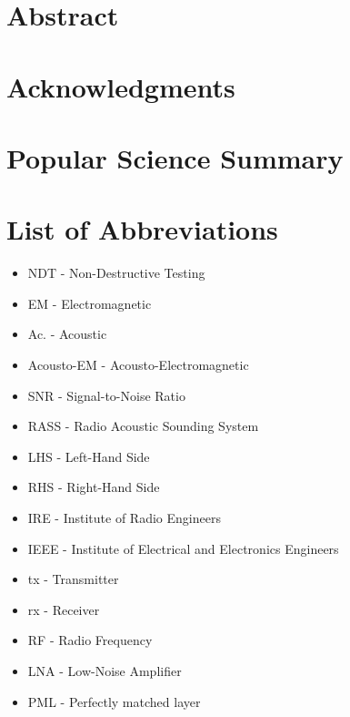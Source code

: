 \documentclass[10pt,a4paper]{eitExjobb}
\begin{document}
	
	
	\MakeTitlePage  %
	
	\frontmatter    %
	
	\chapter*{Abstract}
	
	\chapter*{Acknowledgments}
	
	\chapter*{Popular Science Summary}
	\tableofcontents
	\listoffigures
	\listoftables
	\chapter*{List of Abbreviations}
	\begin{itemize}
		\item NDT - Non-Destructive Testing
		\item EM - Electromagnetic
		\item Ac. - Acoustic
		\item Acousto-EM - Acousto-Electromagnetic
		\item SNR - Signal-to-Noise Ratio
		\item RASS - Radio Acoustic Sounding System
		\item LHS - Left-Hand Side
		\item RHS - Right-Hand Side
		\item IRE - Institute of Radio Engineers
		\item IEEE - Institute of Electrical and Electronics Engineers
		\item tx - Transmitter
		\item rx - Receiver
		\item RF - Radio Frequency
		\item LNA - Low-Noise Amplifier
		\item PML - Perfectly matched layer
	\end{itemize}
	
\end{document}
